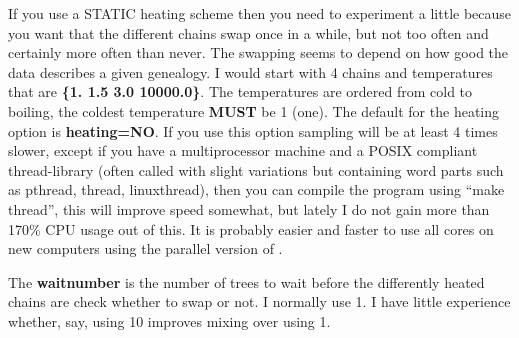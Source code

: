 \begin{description}
If you use a STATIC heating scheme then you need to experiment a little because you want that the different
chains swap once in a while, but not too often and certainly more often
than never. The swapping seems to depend on how good the data describes a 
given genealogy. I would start with 4 chains and 
temperatures that are {\bf \{1. 1.5 3.0 10000.0\}}. 
The temperatures are ordered 
from cold to boiling, the coldest temperature {\bf MUST} be 1 (one).
The default for the heating option is {\bf heating=NO}. If you use
this option sampling will be at least 4 times slower, except 
if you have a multiprocessor machine and a POSIX compliant thread-library
(often called with slight variations but containing word parts such 
as pthread, thread, linuxthread), 
then you can compile the program using ``make thread'',  this will improve speed somewhat, but lately I do not gain more than 170\% CPU usage out of this. It is probably easier and faster to use all cores on new computers using the parallel version of \migrate.

The {\bf waitnumber} is the number of trees to wait before the differently heated chains are check whether to swap or not. I normally use 1. I have little experience whether, say, using 10 improves mixing over using 1.
\end{description}

